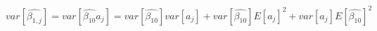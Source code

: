 \begin{equation}
var[\hat{\beta_{1,j}}] = var[\hat{\beta_{10}}a_j] = var[\hat{\beta_{10}}]var[a_j]+var[\hat{\beta_{10}}]E[a_j]^2+var[a_j]E[\hat{\beta_{10}}]^2
\end{equation}